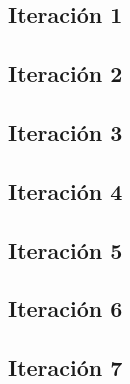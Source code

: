 \subsection{Iteración 1}
\subsection{Iteración 2}
\subsection{Iteración 3}
\subsection{Iteración 4}
\subsection{Iteración 5}
\subsection{Iteración 6}
\subsection{Iteración 7}


